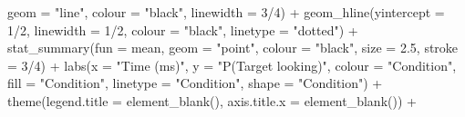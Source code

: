 \documentclass[
  letterpaper,
  DIV=11,
  numbers=noendperiod]{scrartcl}
\newenvironment{Shaded}{\begin{snugshade}}{\end{snugshade}}
\newcommand{\AttributeTok}[1]{\textcolor[rgb]{0.40,0.45,0.13}{#1}}
\newcommand{\DecValTok}[1]{\textcolor[rgb]{0.68,0.00,0.00}{#1}}
\newcommand{\FloatTok}[1]{\textcolor[rgb]{0.68,0.00,0.00}{#1}}
\newcommand{\FunctionTok}[1]{\textcolor[rgb]{0.28,0.35,0.67}{#1}}
\newcommand{\NormalTok}[1]{\textcolor[rgb]{0.00,0.23,0.31}{#1}}
\newcommand{\SpecialCharTok}[1]{\textcolor[rgb]{0.37,0.37,0.37}{#1}}
\newcommand{\StringTok}[1]{\textcolor[rgb]{0.13,0.47,0.30}{#1}}
\begin{document}
\begin{Shaded}
\begin{Highlighting}[]
                 \AttributeTok{geom =} \StringTok{"line"}\NormalTok{,}
                 \AttributeTok{colour =} \StringTok{"black"}\NormalTok{,}
                 \AttributeTok{linewidth =} \DecValTok{3}\SpecialCharTok{/}\DecValTok{4}\NormalTok{) }\SpecialCharTok{+}
    \FunctionTok{geom\_hline}\NormalTok{(}\AttributeTok{yintercept =} \DecValTok{1}\SpecialCharTok{/}\DecValTok{2}\NormalTok{, }
               \AttributeTok{linewidth =} \DecValTok{1}\SpecialCharTok{/}\DecValTok{2}\NormalTok{,}
               \AttributeTok{colour =} \StringTok{"black"}\NormalTok{,}
               \AttributeTok{linetype =} \StringTok{"dotted"}\NormalTok{) }\SpecialCharTok{+}
    \FunctionTok{stat\_summary}\NormalTok{(}\AttributeTok{fun =}\NormalTok{ mean,}
                 \AttributeTok{geom =} \StringTok{"point"}\NormalTok{,}
                 \AttributeTok{colour =} \StringTok{"black"}\NormalTok{,}
                 \AttributeTok{size =} \FloatTok{2.5}\NormalTok{,}
                 \AttributeTok{stroke =} \DecValTok{3}\SpecialCharTok{/}\DecValTok{4}\NormalTok{) }\SpecialCharTok{+}
    \FunctionTok{labs}\NormalTok{(}\AttributeTok{x =} \StringTok{"Time (ms)"}\NormalTok{,}
         \AttributeTok{y =} \StringTok{"P(Target looking)"}\NormalTok{,}
         \AttributeTok{colour =} \StringTok{"Condition"}\NormalTok{,}
         \AttributeTok{fill =} \StringTok{"Condition"}\NormalTok{,}
         \AttributeTok{linetype =} \StringTok{"Condition"}\NormalTok{,}
         \AttributeTok{shape =} \StringTok{"Condition"}\NormalTok{) }\SpecialCharTok{+}
    \FunctionTok{theme}\NormalTok{(}\AttributeTok{legend.title =} \FunctionTok{element\_blank}\NormalTok{(),}
          \AttributeTok{axis.title.x =} \FunctionTok{element\_blank}\NormalTok{()) }\SpecialCharTok{+}
    

\end{Highlighting}
\end{Shaded}
\end{document}
